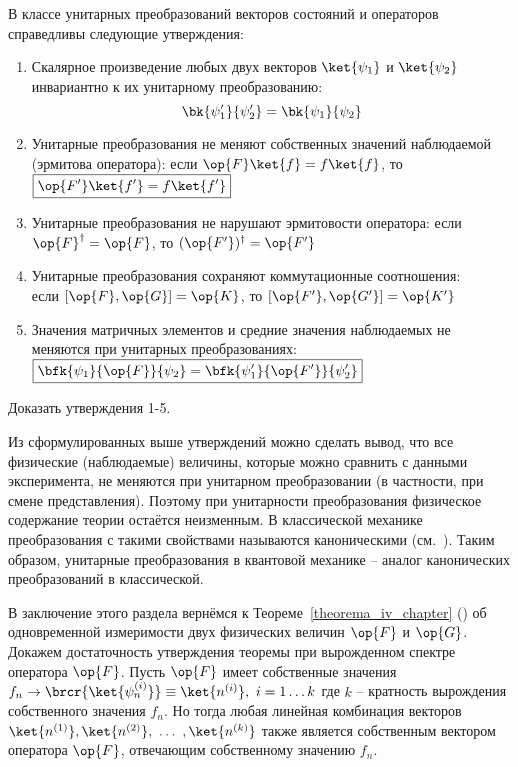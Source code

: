 В классе унитарных преобразований векторов состояний и операторов справедливы следующие утверждения:

\begin{enumerate}

\item Скалярное произведение любых двух векторов $\ket{\psi_1}$ и $\ket{\psi_2}$ инвариантно к их унитарному преобразованию:
$$
\bk{\psi'_1}{\psi'_2}=\bk{\psi_1}{\psi_2}
$$

\item Унитарные преобразования не меняют собственных значений наблюдаемой (эрмитова оператора): если $\op{F}\ket{f}=f\ket{f}$, то $\boxed{\op{F'}\ket{f'}=f\ket{f'}}$

\item Унитарные преобразования не нарушают эрмитовости оператора: если $\op{F}^\dag=\op{F}$, то $(\op{F'})^\dag=\op{F'}$

\item Унитарные преобразования сохраняют коммутационные соотношения: \\
если $[\op{F}, \op{G}]=\op{K}$, то $[\op{F'}, \op{G'}]=\op{K'}$

\item Значения матричных элементов и средние значения наблюдаемых не меняются при унитарных преобразованиях: $\boxed{\bfk{\psi_1}{\op{F}}{\psi_2}=\bfk{\psi'_1}{\op{F'}}{\psi'_2}}$
\end{enumerate}

\begin{excr}
Доказать утверждения 1-5.
\end{excr}

Из сформулированных выше утверждений можно сделать вывод, что все физические (наблюдаемые) величины, которые можно сравнить с данными эксперимента, не меняются при унитарном преобразовании (в частности, при смене представления). Поэтому при унитарности преобразования физическое содержание теории остаётся неизменным. В классической механике преобразования с такими свойствами называются каноническими (см.~). Таким образом, унитарные преобразования в квантовой механике -- аналог канонических преобразований в классической.

В заключение этого раздела вернёмся к Теореме~\ref{theorema_iv_chapter} () об одновременной измеримости двух физических величин $\op{F}$ и $\op{G}$. Докажем достаточность утверждения теоремы при вырожденном спектре оператора $\op{F}$. Пусть $\op{F}$ имеет собственные значения $f_n \rightarrow \brcr{\ket{\psi_n^{(i)}}} \equiv \ket{n^{(i)}},~i = 1 \ldots k$ где $k$ -- кратность вырождения собственного значения $f_n$. Но тогда любая линейная комбинация векторов $\ket{n^{(1)}}, \ket{n^{(2)}},~\ldots~, \ket{n^{(k)}}$ также является собственным вектором оператора $\op{F}$, отвечающим собственному значению $f_n$.

